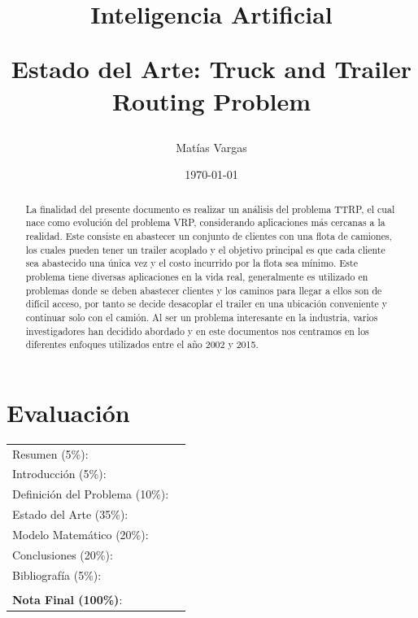 \documentclass[letter, 10pt]{article}
\begin{document}
\title{Inteligencia Artificial \\ \begin{Large}Estado del Arte: Truck and Trailer Routing Problem\end{Large}}
\author {Matías Vargas}
\date{\today}
\maketitle


\section*{Evaluaci\'on}

\begin{tabular}{ll}
Resumen (5\%): & \underline{\hspace{2cm}} \\
Introducci\'on (5\%):  & \underline{\hspace{2cm}} \\
Definici\'on del Problema (10\%):  & \underline{\hspace{2cm}} \\
Estado del Arte (35\%):  & \underline{\hspace{2cm}} \\
Modelo Matem\'atico (20\%): &  \underline{\hspace{2cm}}\\
Conclusiones (20\%): &  \underline{\hspace{2cm}}\\
Bibliograf\'ia (5\%): & \underline{\hspace{2cm}}\\
 &  \\
\textbf{Nota Final (100\%)}:   & \underline{\hspace{2cm}}
\end{tabular}
\vspace{2cm}


\begin{abstract}
La finalidad del presente documento es realizar un  análisis del problema TTRP, el cual nace como evolución del problema VRP, considerando aplicaciones más cercanas a la realidad. Este consiste en abastecer un conjunto de clientes con una flota de camiones, los cuales pueden tener un trailer acoplado y el objetivo principal es que cada cliente sea abastecido una única vez y el costo incurrido por la flota sea mínimo. Este problema tiene diversas aplicaciones en la vida real, generalmente es utilizado en problemas donde se deben abastecer clientes y los caminos para llegar a ellos son de difícil acceso, por tanto se decide desacoplar el trailer en una ubicación conveniente y continuar solo con el camión. Al ser un problema interesante en la industria, varios investigadores han decidido abordado  y en este documentos nos centramos en los diferentes enfoques utilizados entre el año 2002 y 2015.
\end{abstract}
\end{document}
